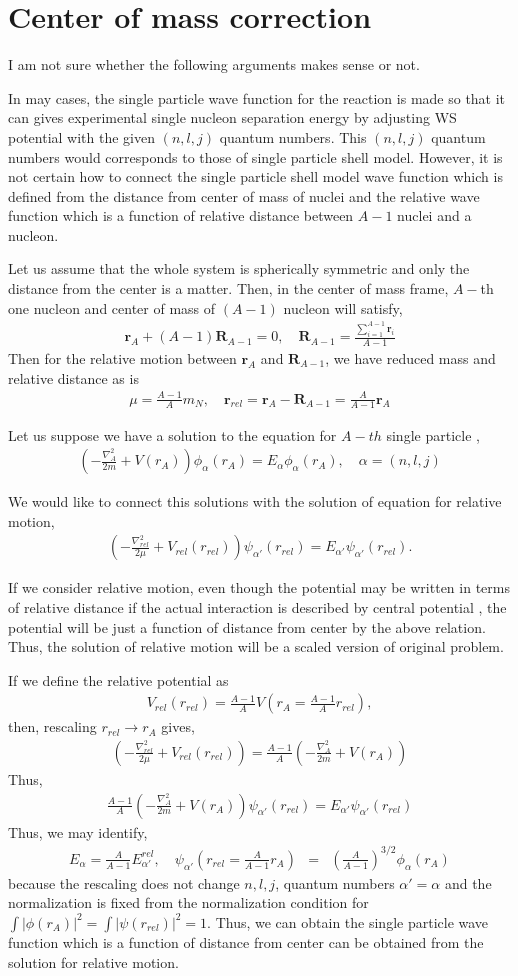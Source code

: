 \documentclass[11pt]{book}
\def\bm{\boldsymbol}
\def\vr{{\bm r}}
\def\vR{{\bm R}}
\newcommand{\bea}{\begin{eqnarray}}
\newcommand{\eea}{\end{eqnarray}}
\begin{document}
\section{Center of mass correction}
I am not sure whether the following arguments makes sense or not. 

In may cases, the single particle wave function for the reaction
is made so that it can gives experimental 
single nucleon separation energy by adjusting WS potential
with the given $(n,l,j)$ quantum numbers. 
This $(n,l,j)$ quantum numbers would corresponds to those of 
single particle shell model. 
However, it is not certain how to connect the single particle
shell model wave function which is defined from the distance
from center of mass of nuclei and the relative wave function
which is a function of relative distance between $A-1$ nuclei
and a nucleon. 

Let us assume that the whole system is spherically symmetric
and only the distance from the center is a matter. 
Then, in the center of mass frame, 
$A-$th one nucleon and center of mass
of $(A-1)$ nucleon will satisfy,
\bea 
\vr_A+(A-1)\vR_{A-1}=0,
\quad \vR_{A-1}=\frac{\sum_{i=1}^{A-1}\vr_i}{A-1}
\eea 
Then for the relative motion between $\vr_A$ and $\vR_{A-1}$,
we have reduced mass and relative distance as
is 
\bea 
\mu=\frac{A-1}{A}m_N,\quad 
\vr_{rel}=\vr_A-\vR_{A-1}=\frac{A}{A-1}\vr_A
\eea 

Let us suppose we have a solution to the equation
for $A-th$ single particle ,
\bea 
\left(-\frac{\nabla^2_A}{2m}+V(r_A)\right) \phi_{\alpha}(r_A)
= E_\alpha \phi_\alpha(r_A), \quad \alpha=(n,l,j)
\eea 

We would like to connect this solutions with the solution of 
equation for relative motion,
\bea 
\left(-\frac{\nabla^2_{rel}}{2\mu}+V_{rel}(r_{rel})\right) \psi_{\alpha'}(r_{rel})
= E_{\alpha'} \psi_{\alpha'}(r_{rel}).
\eea 

If we consider relative motion, even though the potential
may be written in terms of relative distance
if the actual interaction is described by central potential
, the potential will
be just a function of distance from center by the above relation. 
Thus, the solution of relative motion will be a scaled version
of original problem. 

If we define the relative potential as
\bea 
V_{rel}(r_{rel})=\frac{A-1}{A} V(r_A=\frac{A-1}{A}r_{rel}),
\eea 
then, rescaling $r_{rel}\to r_A$ gives,
\bea 
\left(-\frac{\nabla^2_{rel}}{2\mu}+V_{rel}(r_{rel})\right)
=\frac{A-1}{A} \left(-\frac{\nabla^2_A}{2m}+V(r_A)\right)    
\eea 
Thus,
\bea 
\frac{A-1}{A}\left(-\frac{\nabla^2_A}{2m}+V(r_A)\right)
\psi_{\alpha'}(r_{rel})=E_{\alpha'}\psi_{\alpha'}(r_{rel})
\eea 
Thus, we may identify,
\bea 
E_\alpha=\frac{A}{A-1}E_{\alpha'}^{rel},\quad 
\psi_{\alpha'}(r_{rel}=\frac{A}{A-1}r_A)&=&
\left(\frac{A}{A-1}\right)^{3/2}\phi_\alpha(r_A) 
\eea 
because the rescaling does not change $n,l,j$, quantum numbers $\alpha'=\alpha$ and the normalization is 
fixed from the normalization condition for 
$\int |\phi(r_A)|^2=\int |\psi(r_{rel})|^2=1$. 
Thus, we can obtain the single particle wave function 
which is a function of distance from center can be obtained from
the solution for relative motion. 
\end{document}

